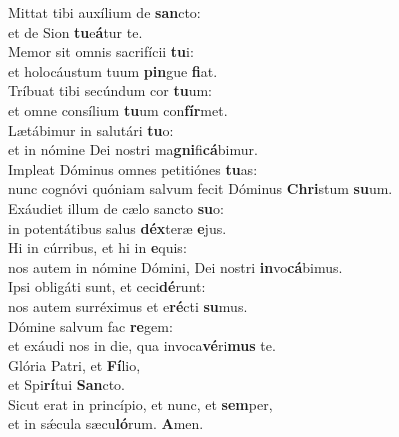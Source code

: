 \evenverse Mittat tibi auxílium de \textbf{san}cto:~\*\\
\evenverse et de Sion \textbf{tu}e\textbf{á}tur te.\\
\oddverse Memor sit omnis sacrifícii \textbf{tu}i:~\*\\
\oddverse et holocáustum tuum \textbf{pin}gue \textbf{fi}at.\\
\evenverse Tríbuat tibi secúndum cor \textbf{tu}um:~\*\\
\evenverse et omne consílium \textbf{tu}um con\textbf{fír}met.\\
\oddverse Lætábimur in salutári \textbf{tu}o:~\*\\
\oddverse et in nómine Dei nostri ma\textbf{gni}fi\textbf{cá}bimur.\\
\evenverse Impleat Dóminus omnes petitiónes \textbf{tu}as:~\*\\
\evenverse nunc cognóvi quóniam salvum fecit Dóminus \textbf{Chri}stum \textbf{su}um.\\
\oddverse Exáudiet illum de cælo sancto \textbf{su}o:~\*\\
\oddverse in potentátibus salus \textbf{déx}teræ \textbf{e}jus.\\
\evenverse Hi in cúrribus, et hi in \textbf{e}quis:~\*\\
\evenverse nos autem in nómine Dómini, Dei nostri \textbf{in}vo\textbf{cá}bimus.\\
\oddverse Ipsi obligáti sunt, et ceci\textbf{dé}runt:~\*\\
\oddverse nos autem surréximus et e\textbf{ré}cti \textbf{su}mus.\\
\evenverse Dómine salvum fac \textbf{re}gem:~\*\\
\evenverse et exáudi nos in die, qua invoca\textbf{vé}ri\textbf{mus} te.\\
\oddverse Glória Patri, et \textbf{Fí}lio,~\*\\
\oddverse et Spi\textbf{rí}tui \textbf{San}cto.\\
\evenverse Sicut erat in princípio, et nunc, et \textbf{sem}per,~\*\\
\evenverse et in sǽcula sæcu\textbf{ló}rum. \textbf{A}men.\\
